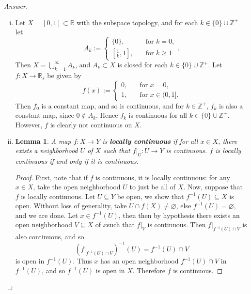 \documentclass[12pt]{article}
\newcommand{\z}{\mathbb{Z}}
\newcommand{\real}{\mathbb{R}}
\newcommand\inv[1]{#1^{-1}}
\newcommand\paren[1]{\left( #1 \right)}
\newcommand\setb[1]{\left \{ #1 \right \}}
\newtheorem{lemma}[theorem]{Lemma}
\theoremstyle{definition}
\begin{document}
\begin{proof}[Answer]
\begin{enumerate}[(i)]
        Note that if the collection $\setb{ A_{\alpha} }_{\alpha \in J}$ is infinite, then the above proof will not work since the infinite union of closed sets may not be closed.
        \item Let $X=[0,1]\subset\real$ with the subspace topology, and for each $k\in\{0\}\cup\z^+$ let
        \[A_k:=
        \begin{cases}
            \{0\},&\quad\text{for }k=0,\\
            \left[\frac{1}{k},1\right],&\quad\text{for }k\geq1
        \end{cases}.
        \]
        Then $X=\bigcup\limits_{k=1}^{\infty}A_k$, and $A_k\subset X$ is closed for each $k\in\{0\}\cup\z^+$. Let $f:X\to\real_s$ be given by 
        \[
            f(x):=
            \begin{cases}
                0,&\quad\text{for }x=0,\\
                1,&\quad\text{for }x\in(0,1].
            \end{cases}
        \]
        Then $f_0$ is a constant map, and so is continuous, and for $k\in\z^+$, $f_k$ is also a constant map, since $0\notin A_k$. Hence $f_k$ is continuous for all $k\in\{0\}\cup\z^+$. However, $f$ is clearly not continuous on $X$.
        \item
        \begin{lemma}
            A map $f : X \to Y$ is \textbf{locally continuous} if for all $x \in X$, there exists a neighborhood $U$ of $X$ such that $\left. f \right|_U : U \to Y$ is continuous. $f$ is locally continuous if and only if it is continuous.
        \end{lemma}
        \begin{proof}
            First, note that if $f$ is continuous, it is locally continuous: for any $x \in X$, take the open neighborhood $U$ to just be all of $X$. Now, suppose that $f$ is locally continuous. Let $U \subseteq Y$ be open, we show that $\inv{f}(U) \subseteq X$ is open. Without loss of generality, take $U \cap f(X) \neq \varnothing$, else $\inv{f}(U) = \varnothing$, and we are done. Let $x \in \inv{f}(U)$, then then by hypothesis there exists an open neighborhood $V \subseteq X$ of $x$such that $\left. f \right|_V$ is continuous. Then $\left. f \right|_{\inv{f}(U) \cap V}$ is also continuous, and so
            \[
                \inv{ \paren{ \left. f \right|_{ \inv{f}(U) \cap V } } }(U) = \inv{f}(U) \cap V
            \]
            is open in $\inv{f}(U)$. Thus $x$ has an open neighborhood $\inv{f}(U) \cap V$ in $\inv{f}(U)$, and so $\inv{f}(U)$ is open in $X$. Therefore $f$ is continuous. 

\end{proof}
\end{enumerate}
\end{proof}
\end{document}
